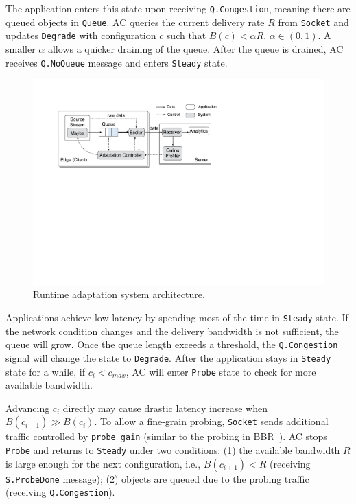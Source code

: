  The application enters this state upon
receiving \texttt{Q.Congestion}, meaning there are queued objects in
\texttt{Queue}. AC queries the current delivery rate $R$ from \texttt{Socket}
and updates \texttt{Degrade} with configuration $c$ such that $B(c) < \alpha R$,
$\alpha \in (0, 1)$. A smaller $\alpha$ allows a quicker draining of the
queue. After the queue is drained, AC receives \texttt{Q.NoQueue} message and
enters \texttt{Steady} state.

\begin{figure}
  \centering
  \includegraphics[width=\linewidth]{figures/runtime-adaptation.pdf}
  \caption{Runtime adaptation system architecture.}
  \label{fig:runtime}
\end{figure}

 Applications achieve low latency by
spending most of the time in \texttt{Steady} state. If the network condition
changes and the delivery bandwidth is not sufficient, the queue will grow. Once
the queue length exceeds a threshold, the \texttt{Q.Congestion} signal will
change the state to \texttt{Degrade}. After the application stays in
\texttt{Steady} state for a while, if $c_i < c_{max}$, AC will enter
\texttt{Probe} state to check for more available bandwidth.

 Advancing $c_i$ directly may
cause drastic latency increase when $B(c_{i+1}) \gg B(c_i)$. To allow a
fine-grain probing, \texttt{Socket} sends additional traffic controlled by
\texttt{probe\_gain} (similar to the probing in BBR~\cite{cardwell2017bbr}).  AC
stops \texttt{Probe} and returns to \texttt{Steady} under two conditions: (1)
the available bandwidth $R$ is large enough for the next configuration, i.e.,
$B(c_{i+1}) < R$ (receiving \texttt{S.ProbeDone} message); (2) objects are
queued due to the probing traffic (receiving \texttt{Q.Congestion}).

